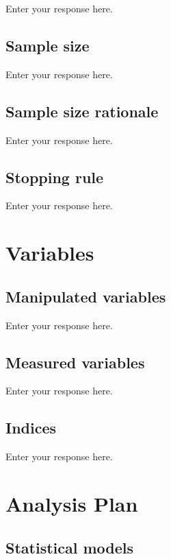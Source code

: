 \documentclass[]{article}
\begin{document}
Enter your response here.

\subsection{Sample size}\label{sample-size}

Enter your response here.

\subsection{Sample size rationale}\label{sample-size-rationale}

Enter your response here.

\subsection{Stopping rule}\label{stopping-rule}

Enter your response here.

\section{Variables}\label{variables}

\subsection{Manipulated variables}\label{manipulated-variables}

Enter your response here.

\subsection{Measured variables}\label{measured-variables}

Enter your response here.

\subsection{Indices}\label{indices}

Enter your response here.

\section{Analysis Plan}\label{analysis-plan}

\subsection{Statistical models}\label{statistical-models}
\end{document}
